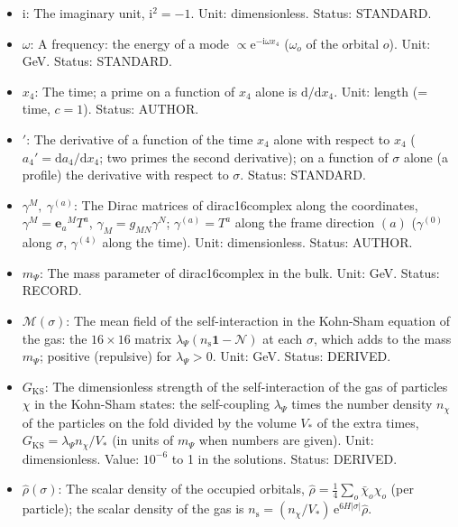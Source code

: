 \documentclass[
  10pt,
]{article}
\begin{document}
\begin{itemize}
  second label of a Kohn-Sham orbital, with the Kronecker delta of the
  two labels. Status: STANDARD.
\item
  \(\mathrm{i}\): The imaginary unit, \(\mathrm{i}^2 = -1\). Unit:
  dimensionless. Status: STANDARD.
\item
  \(\omega\): A frequency: the energy of a mode
  \(\propto \mathrm{e}^{-\mathrm{i}\omega x_4}\) (\(\omega_o\) of the
  orbital \(o\)). Unit: GeV. Status: STANDARD.
\item
  \(x_4\): The time; a prime on a function of \(x_4\) alone is
  \(\mathrm{d}/\mathrm{d}x_4\). Unit: length (= time, \(c = 1\)).
  Status: AUTHOR.
\item
  \({}'\): The derivative of a function of the time \(x_4\) alone with
  respect to \(x_4\) (\(a_4' = \mathrm{d}a_4/\mathrm{d}x_4\); two primes
  the second derivative); on a function of \(\sigma\) alone (a profile)
  the derivative with respect to \(\sigma\). Status: STANDARD.
\item
  \(\gamma^M,\ \gamma^{(a)}\): The Dirac matrices of dirac16complex
  along the coordinates, \(\gamma^M = \mathbf{e}_a{}^MT^a\),
  \(\gamma_M = g_{MN}\gamma^N\); \(\gamma^{(a)} = T^a\) along the frame
  direction \((a)\) (\(\gamma^{(0)}\) along \(\sigma\), \(\gamma^{(4)}\)
  along the time). Unit: dimensionless. Status: AUTHOR.
\item
  \(m_\Psi\): The mass parameter of dirac16complex in the bulk. Unit:
  GeV. Status: RECORD.
\item
  \(\mathcal{M}(\sigma)\): The mean field of the self-interaction in the
  Kohn-Sham equation of the gas: the \(16 \times 16\) matrix
  \(\lambda_\Psi(n_{\mathrm{s}}\mathbf{1} - \mathcal{N})\) at each
  \(\sigma\), which adds to the mass \(m_\Psi\); positive (repulsive)
  for \(\lambda_\Psi > 0\). Unit: GeV. Status: DERIVED.
\item
  \(G_{\mathrm{KS}}\): The dimensionless strength of the
  self-interaction of the gas of particles \(\chi\) in the Kohn-Sham
  states: the self-coupling \(\lambda_\Psi\) times the number density
  \(n_\chi\) of the particles on the fold divided by the volume \(V_*\)
  of the extra times, \(G_{\mathrm{KS}} = \lambda_\Psi n_\chi/V_*\) (in
  units of \(m_\Psi\) when numbers are given). Unit: dimensionless.
  Value: \(10^{-6}\) to 1 in the solutions. Status: DERIVED.
\item
  \(\hat\rho(\sigma)\): The scalar density of the occupied orbitals,
  \(\hat\rho = \frac14\sum_o\bar\chi_o\chi_o\) (per particle); the
  scalar density of the gas is
  \(n_{\mathrm{s}} = (n_\chi/V_*)\,\mathrm{e}^{6H\lvert\sigma\rvert}\hat\rho\).

\end{itemize}
\end{document}
